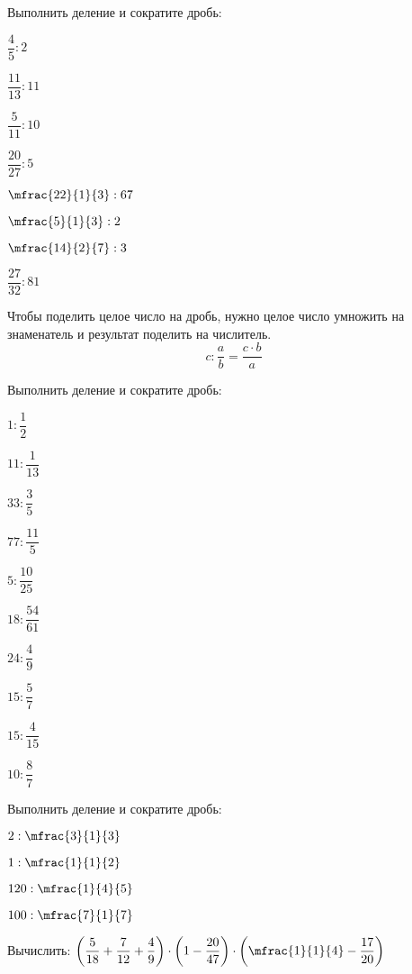 \begin{class}[number=2]
\begin{definit}
		\end{definit}
	\begin{listofex}[resume]
		\item Выполнить деление и сократите дробь:
		\begin{enumcols}[itemcolumns=4]
			\item \( \dfrac{4}{5}:2 \)
			\item \( \dfrac{11}{13}:11 \)
			\item \( \dfrac{5}{11}:10 \)
			\item \( \dfrac{20}{27}:5 \)
			\item \( \mfrac{22}{1}{3}:67 \)
			\item \( \mfrac{5}{1}{3}:2 \)
			\item \( \mfrac{14}{2}{7}:3 \)
			\item \( \dfrac{27}{32}:81 \)
		\end{enumcols}
	\end{listofex}
		\begin{definit}
			Чтобы поделить целое число на дробь, нужно целое число умножить на знаменатель и результат поделить на числитель.
			\[ c:\dfrac{a}{b}=\dfrac{c\cdot b}{a} \]
		\end{definit}
	\begin{listofex}[resume]
			\item Выполнить деление и сократите дробь:
			\begin{enumcols}[itemcolumns=5]
				\item \( 1:\dfrac{1}{2} \)
				\item \( 11:\dfrac{1}{13} \)
				\item \( 33:\dfrac{3}{5} \)
				\item \( 77:\dfrac{11}{5} \)
				\item \( 5:\dfrac{10}{25} \)
				\item \( 18:\dfrac{54}{61} \)
				\item \( 24:\dfrac{4}{9} \)
				\item \( 15:\dfrac{5}{7} \)
				\item \( 15:\dfrac{4}{15} \)
				\item \( 10:\dfrac{8}{7} \)
			\end{enumcols}
			\item Выполнить деление и сократите дробь:
		\begin{enumcols}[itemcolumns=4]
			\item \( 2:\mfrac{3}{1}{3} \)
			\item \( 1:\mfrac{1}{1}{2} \)
			\item \( 120:\mfrac{1}{4}{5} \)
			\item \( 100:\mfrac{7}{1}{7} \)
		\end{enumcols}
	\item Вычислить: \( \left( \dfrac{5}{18}+\dfrac{7}{12}+\dfrac{4}{9} \right)\cdot\left( 1-\dfrac{20}{47} \right)\cdot\left( \mfrac{1}{1}{4}-\dfrac{17}{20} \right) \)
	\end{listofex}
\end{class}
